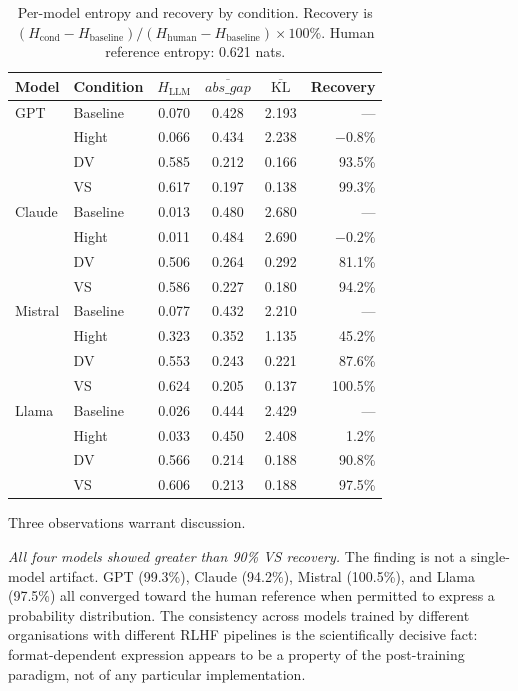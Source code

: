 \begin{table}[t]
  \centering
  \caption{Per-model entropy and recovery by condition. Recovery is
    $(H_{\text{cond}} - H_{\text{baseline}}) /
    (H_{\text{human}} - H_{\text{baseline}}) \times 100\%$.
    Human reference entropy: 0.621 nats.}
  \label{tab:d1_model_breakdown}
  \begin{tabular}{llcccr}
    \toprule
    Model & Condition & $H_{\text{LLM}}$ & $\overline{\textit{abs\_gap}}$
          & $\overline{\text{KL}}$ & Recovery \\
    \midrule
    GPT     & Baseline  & 0.070 & 0.428 & 2.193 & — \\
            & Hight     & 0.066 & 0.434 & 2.238 & $-0.8\%$ \\
            & DV        & 0.585 & 0.212 & 0.166 & 93.5\% \\
            & VS        & 0.617 & 0.197 & 0.138 & 99.3\% \\
    \midrule
    Claude  & Baseline  & 0.013 & 0.480 & 2.680 & — \\
            & Hight     & 0.011 & 0.484 & 2.690 & $-0.2\%$ \\
            & DV        & 0.506 & 0.264 & 0.292 & 81.1\% \\
            & VS        & 0.586 & 0.227 & 0.180 & 94.2\% \\
    \midrule
    Mistral & Baseline  & 0.077 & 0.432 & 2.210 & — \\
            & Hight     & 0.323 & 0.352 & 1.135 & 45.2\% \\
            & DV        & 0.553 & 0.243 & 0.221 & 87.6\% \\
            & VS        & 0.624 & 0.205 & 0.137 & 100.5\% \\
    \midrule
    Llama   & Baseline  & 0.026 & 0.444 & 2.429 & — \\
            & Hight     & 0.033 & 0.450 & 2.408 & 1.2\% \\
            & DV        & 0.566 & 0.214 & 0.188 & 90.8\% \\
            & VS        & 0.606 & 0.213 & 0.188 & 97.5\% \\
    \bottomrule
  \end{tabular}
\end{table}

Three observations warrant discussion.

\textit{All four models showed greater than 90\% VS recovery.} The
finding is not a single-model artifact. GPT (99.3\%), Claude (94.2\%),
Mistral (100.5\%), and Llama (97.5\%) all converged toward the human
reference when permitted to express a probability distribution. The
consistency across models trained by different organisations with
different RLHF pipelines \citep{ouyang-2022-instructgpt, bai-2022-constitutional} is the scientifically decisive fact: format-dependent
expression appears to be a property of the post-training paradigm, not of
any particular implementation.

